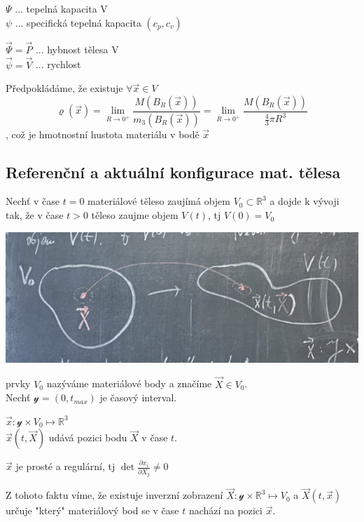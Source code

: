 \documentclass[../main.tex]{subfiles}
\begin{document}
\begin{example}
    $\Psi$ ... tepelná kapacita V \\
    $\psi$ ... specifická tepelná kapacita $(c_p, c_v)$

    $\vec{\Psi} = \vec{P}$ ... hybnost tělesa V \\
    $\vec{\psi} = \vec{V}$ ... rychlost 
\end{example}

Předpokládáme, že existuje $\forall \vec{x} \in V$
\begin{equation*}
    \varrho(\vec{x})= \lim_{R\rightarrow0^+} \frac{M(B_R (\vec{x}))}{m_3 (B_R (\vec{x}))} = \lim_{R\rightarrow0^+} \frac{M(B_R (\vec{x}))}{\frac{4}{3}\pi R^3} 
\end{equation*}
, což je hmotnostní hustota materiálu v bodě $\vec{x}$







\subsection{Referenční a aktuální konfigurace mat. tělesa}
Nechť v čase $t=0$ materiálové těleso zaujímá objem $V_0\subset \mathbb{R}^3$ a dojde k 
vývoji tak, že v čase $t>0$ těleso zaujme objem $V(t)$, tj $V(0) = V_{0}$

\begin{center}
    \includegraphics[width=0.5\linewidth]{images/13-10-konfigurace.jpg}
\end{center}
prvky $V_0$ nazýváme materiálové body a značíme $\vec{X} \in V_0 $.\\
Nechť $\mathcal{y} = (0, t_{max})$ je časový interval.

$\vec{x} : \mathcal{y} \times V_0 \mapsto \mathbb{R}^3$\\
$\vec{x}(t, \vec{X})$ udává pozici bodu $\vec{X}$ v čase $t$.

$\vec{x}$ je prosté a regulární, tj $\det\frac{\partial x_i}{\partial X_j} \neq 0$

Z tohoto faktu víme, že existuje inverzní zobrazení $\vec{X} : \mathcal{y} \times \mathbb{R}^3 \mapsto V_0$  a 
$\vec{X}(t, \vec{x})$ určuje "který" materiálový bod se v čase $t$ nachází na pozici $\vec{x}$.
\end{document}
